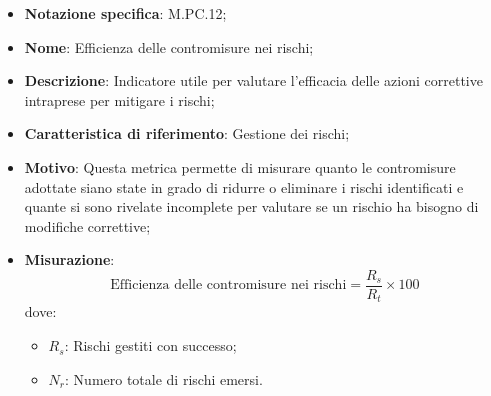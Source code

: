 \begin{itemize}
    \item \textbf{Notazione specifica}: M.PC.12;
    \item \textbf{Nome}: Efficienza delle contromisure nei rischi;
    \item \textbf{Descrizione}: Indicatore utile per valutare l'efficacia delle azioni correttive intraprese per mitigare i rischi;
    \item \textbf{Caratteristica di riferimento}: Gestione dei rischi;
    \item \textbf{Motivo}: Questa metrica permette di misurare quanto le contromisure adottate siano state in grado di ridurre o eliminare i rischi identificati e quante si sono rivelate incomplete per valutare se un rischio ha bisogno di modifiche correttive;
    \item \textbf{Misurazione}:
    \[
        \text{Efficienza delle contromisure nei rischi} = \frac{R_s}{R_t} \times 100
    \]
    dove:
    \begin{itemize}
        \item $R_{s}$: Rischi gestiti con successo;
        \item $N_{r}$: Numero totale di rischi emersi.
    \end{itemize}
\end{itemize}